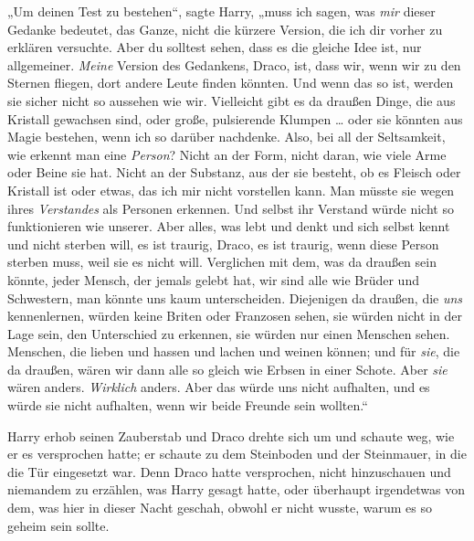 „Um deinen Test zu bestehen“, sagte Harry, „muss ich sagen, was \emph{mir} dieser Gedanke bedeutet, das Ganze, nicht die kürzere Version, die ich dir vorher zu erklären versuchte. Aber du solltest sehen, dass es die gleiche Idee ist, nur allgemeiner. \emph{Meine} Version des Gedankens, Draco, ist, dass wir, wenn wir zu den Sternen fliegen, dort andere Leute finden könnten. Und wenn das so ist, werden sie sicher nicht so aussehen wie wir. Vielleicht gibt es da draußen Dinge, die aus Kristall gewachsen sind, oder große, pulsierende Klumpen … oder sie könnten aus Magie bestehen, wenn ich so darüber nachdenke. Also, bei all der Seltsamkeit, wie erkennt man eine \emph{Person}? Nicht an der Form, nicht daran, wie viele Arme oder Beine sie hat. Nicht an der Substanz, aus der sie besteht, ob es Fleisch oder Kristall ist oder etwas, das ich mir nicht vorstellen kann. Man müsste sie wegen ihres \emph{Verstandes} als Personen erkennen. Und selbst ihr Verstand würde nicht so funktionieren wie unserer. Aber alles, was lebt und denkt und sich selbst kennt und nicht sterben will, es ist traurig, Draco, es ist traurig, wenn diese Person sterben muss, weil sie es nicht will. Verglichen mit dem, was da draußen sein könnte, jeder Mensch, der jemals gelebt hat, wir sind alle wie Brüder und Schwestern, man könnte uns kaum unterscheiden. Diejenigen da draußen, die \emph{uns} kennenlernen, würden keine Briten oder Franzosen sehen, sie würden nicht in der Lage sein, den Unterschied zu erkennen, sie würden nur einen Menschen sehen. Menschen, die lieben und hassen und lachen und weinen können; und für \emph{sie}, die da draußen, wären wir dann alle so gleich wie Erbsen in einer Schote. Aber \emph{sie} wären anders. \emph{Wirklich} anders. Aber das würde uns nicht aufhalten, und es würde sie nicht aufhalten, wenn wir beide Freunde sein wollten.“

Harry erhob seinen Zauberstab und Draco drehte sich um und schaute weg, wie er es versprochen hatte; er schaute zu dem Steinboden und der Steinmauer, in die die Tür eingesetzt war. Denn Draco hatte versprochen, nicht hinzuschauen und niemandem zu erzählen, was Harry gesagt hatte, oder überhaupt irgendetwas von dem, was hier in dieser Nacht geschah, obwohl er nicht wusste, warum es so geheim sein sollte.

